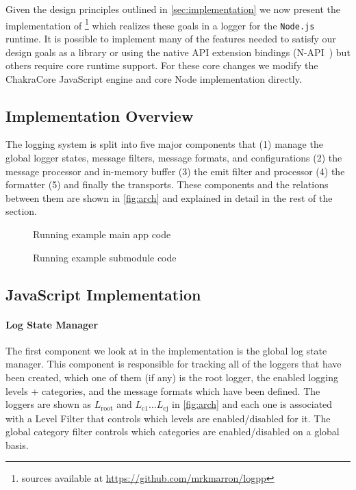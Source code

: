 Given the design principles outlined in \autoref{sec:implementation} we now 
present the implementation of \projn\footnote{\projn sources available at 
\url{https://github.com/mrkmarron/logpp}} which realizes these goals in a logger 
for the \texttt{Node.js}~\cite{Node} runtime. It is possible to implement many 
of the features needed to satisfy our design goals as a library or using the 
native API extension bindings (N-API~\cite{NAPI}) but others require core 
runtime support. For these core changes we modify the ChakraCore JavaScript 
engine and core Node implementation directly.

\subsection{Implementation Overview}
The logging system is split into five major components that (1) manage the 
global logger states, message filters, message formats, and configurations (2) the message processor and in-memory buffer 
(3) the emit filter and processor (4) the formatter (5) and finally the transports. These 
components and the relations between them are shown in \autoref{fig:arch} and 
explained in detail in the rest of the section. 

\begin{figure*}[t]
\begin{minipage}[b]{0.47\textwidth}
     
    \caption{Running example main app code}
    \label{fig:appmain}
\end{minipage}
\begin{minipage}[b]{0.47\textwidth}
    
    \caption{Running example submodule code}
    \label{fig:appsub}
\end{minipage}
\end{figure*}

\subsection{JavaScript Implementation}
\label{subsec:jsimpl}
\paragraph{Log State Manager}
\noindent
The first component we look at in the implementation is the global log state 
manager. This component is responsible for tracking all of the loggers that 
have been created, which one of them (if any) is the root logger, the enabled logging levels + 
categories, and the message formats which have been defined. The loggers are shown as $L_{\text{root}}$ 
and $L_{\text{c1}} \ldots L_{\text{cj}}$ in  \autoref{fig:arch} and each one is associated with a Level Filter 
that controls which levels are enabled/disabled for it. The global category filter controls which categories are 
enabled/disabled on a global basis.

